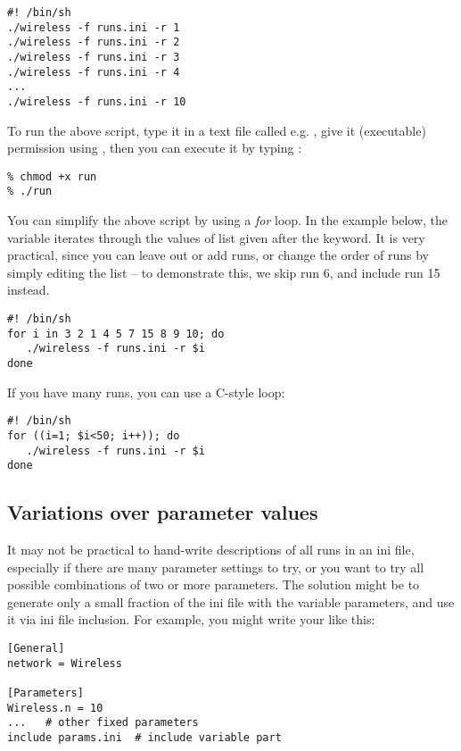\begin{verbatim}
#! /bin/sh
./wireless -f runs.ini -r 1
./wireless -f runs.ini -r 2
./wireless -f runs.ini -r 3
./wireless -f runs.ini -r 4
...
./wireless -f runs.ini -r 10
\end{verbatim}

To run the above script, type it in a text file called e.g. ,
give it  (executable) permission using ,
then you can execute it by typing :

\begin{verbatim}
% chmod +x run
% ./run
\end{verbatim}

You can simplify the above script by using a \textit{for} loop.
In the example below, the variable  iterates through
the values of list given after the  keyword.
It is very practical, since you can leave out or add runs,
or change the order of runs by simply editing the list --
to demonstrate this, we skip run 6, and include run 15 instead.

\begin{verbatim}
#! /bin/sh
for i in 3 2 1 4 5 7 15 8 9 10; do
   ./wireless -f runs.ini -r $i
done
\end{verbatim}

If you have many runs, you can use a C-style loop:

\begin{verbatim}
#! /bin/sh
for ((i=1; $i<50; i++)); do
   ./wireless -f runs.ini -r $i
done
\end{verbatim}


\subsection{Variations over parameter values}

It may not be practical to hand-write descriptions of all runs
in an ini file, especially if there are many parameter
settings to try, or you want to try all possible
combinations of two or more parameters.
The solution might be to generate only a small fraction
of the ini file with the variable parameters, and
use it via ini file inclusion. For example, you might
write your  like this:

\begin{verbatim}
[General]
network = Wireless

[Parameters]
Wireless.n = 10
...   # other fixed parameters
include params.ini  # include variable part
\end{verbatim}

